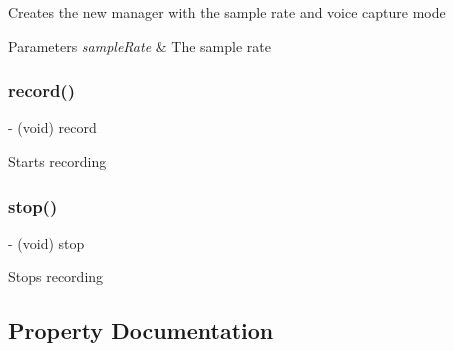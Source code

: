 Creates the new manager with the sample rate and voice capture mode 
\begin{DoxyParams}{Parameters}
{\em sample\+Rate} & The sample rate \\
\hline
\end{DoxyParams}
\hypertarget{interface_o_p_c_s_capture_voice2_buffer_manager_a6568ab939086992e738fa6fc9c246aad}{}\label{interface_o_p_c_s_capture_voice2_buffer_manager_a6568ab939086992e738fa6fc9c246aad} 
\subsubsection{\texorpdfstring{record()}{record()}}
{\footnotesize\ttfamily -\/ (void) record \begin{DoxyParamCaption}{ }\end{DoxyParamCaption}}

Starts recording \hypertarget{interface_o_p_c_s_capture_voice2_buffer_manager_a128ff30057dac0daf502f6d188a325b6}{}\label{interface_o_p_c_s_capture_voice2_buffer_manager_a128ff30057dac0daf502f6d188a325b6} 
\subsubsection{\texorpdfstring{stop()}{stop()}}
{\footnotesize\ttfamily -\/ (void) stop \begin{DoxyParamCaption}{ }\end{DoxyParamCaption}}

Stops recording 

\subsection{Property Documentation}
\hypertarget{interface_o_p_c_s_capture_voice2_buffer_manager_a5e9fbf99d3c104971586ddefe48bbb56}{}\label{interface_o_p_c_s_capture_voice2_buffer_manager_a5e9fbf99d3c104971586ddefe48bbb56} 
